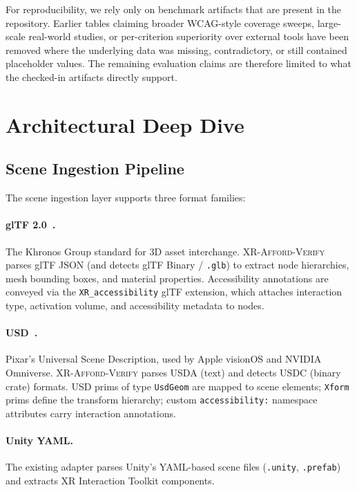 \documentclass[11pt,letterpaper]{article}
\newcommand{\tool}{\textsc{XR-Afford-Verify}}
\begin{document}
For reproducibility, we rely only on benchmark artifacts that are present in the
repository.  Earlier tables claiming broader WCAG-style coverage sweeps,
large-scale real-world studies, or per-criterion superiority over external tools
have been removed where the underlying data was missing, contradictory, or still
contained placeholder values.  The remaining evaluation claims are therefore
limited to what the checked-in artifacts directly support.

\section{Architectural Deep Dive}
\label{sec:architecture}

\subsection{Scene Ingestion Pipeline}

The scene ingestion layer supports three format families:

\paragraph{glTF 2.0~\cite{gltf}.}
The Khronos Group standard for 3D asset interchange.
\tool{} parses glTF JSON (and detects glTF Binary / \texttt{.glb}) to extract node hierarchies, mesh bounding boxes, and material properties.
Accessibility annotations are conveyed via the \texttt{XR\_accessibility} glTF extension, which attaches interaction type, activation volume, and accessibility metadata to nodes.

\paragraph{USD~\cite{usd}.}
Pixar's Universal Scene Description, used by Apple visionOS and NVIDIA Omniverse.
\tool{} parses USDA (text) and detects USDC (binary crate) formats.
USD prims of type \texttt{UsdGeom} are mapped to scene elements; \texttt{Xform} prims define the transform hierarchy; custom \texttt{accessibility:} namespace attributes carry interaction annotations.

\paragraph{Unity YAML.}
The existing adapter parses Unity's YAML-based scene files (\texttt{.unity}, \texttt{.prefab}) and extracts XR Interaction Toolkit components.
\end{document}
